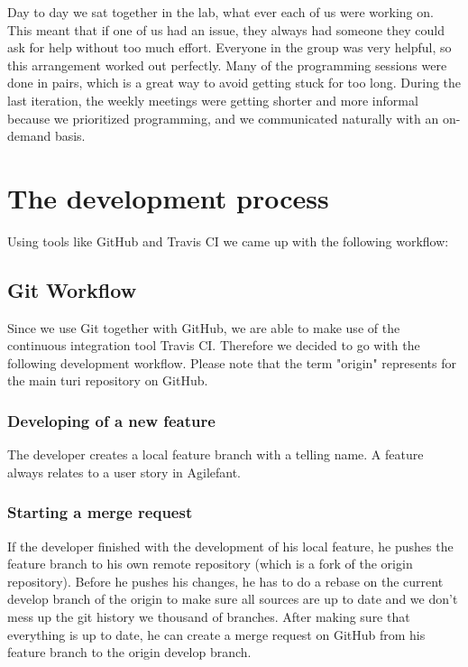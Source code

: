 \documentclass[a4paper]{article}
\begin{document}
\noindent
Day to day we sat together in the lab, what ever each of us were working on. This meant that if one of us had an issue, they always had someone they could ask for help without too much effort. Everyone in the group was very helpful, so this arrangement worked out perfectly. Many of the programming sessions were done in pairs, which is a great way to avoid getting stuck for too long. During the last iteration, the weekly meetings were getting shorter and more informal because we prioritized programming, and we communicated naturally with an on-demand basis.




\section{The development process}

Using tools like GitHub and Travis CI we came up with the following workflow:

\subsection{Git Workflow}
Since we use Git together with GitHub, we are able to make use of the continuous integration tool Travis CI. Therefore we decided to go with the following development workflow. Please note that the term "origin" represents for the main turi repository on GitHub.


\subsubsection{Developing of a new feature}
The developer creates a local feature branch with a telling name. A feature always relates to a user story in Agilefant.


\subsubsection{Starting a merge request}
If the developer finished with the development of his local feature, he pushes the feature branch to his own remote repository (which is a fork of the origin repository). Before he pushes his changes, he has to do a rebase on the current develop branch of the origin to make sure all sources are up to date and we don't mess up the git history we thousand of branches. After making sure that everything is up to date, he can create a merge request on GitHub from his feature branch to the origin develop branch.
\end{document}
